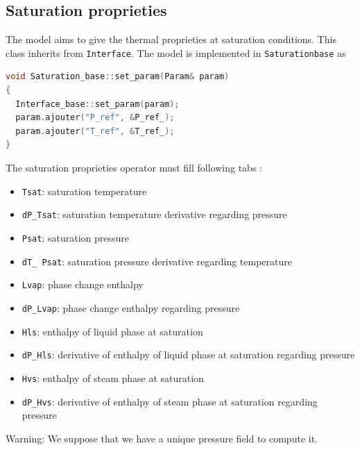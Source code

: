 \subsection{Saturation proprieties}
The model aims to give the thermal proprieties at saturation conditions. This class inherits from \texttt{Interface}.
The model is implemented in \texttt{Saturation\textunderscore base} as
\begin{lstlisting}[language=c++]
void Saturation_base::set_param(Param& param)
{
  Interface_base::set_param(param);
  param.ajouter("P_ref", &P_ref_);
  param.ajouter("T_ref", &T_ref_);
}
\end{lstlisting}
The saturation proprieties operator must fill following tabs :
\begin{itemize}
   \item[\small \textcolor{blue}{\ding{109}}] \texttt{Tsat}: saturation temperature
   \item[\small \textcolor{blue}{\ding{109}}] \texttt{dP\_Tsat}: saturation temperature derivative regarding pressure
   \item[\small \textcolor{blue}{\ding{109}}] \texttt{Psat}: saturation pressure
   \item[\small \textcolor{blue}{\ding{109}}] \texttt{dT\_ Psat}: saturation pressure derivative regarding temperature
   \item[\small \textcolor{blue}{\ding{109}}] \texttt{Lvap}: phase change enthalpy
   \item[\small \textcolor{blue}{\ding{109}}] \texttt{dP\_Lvap}: phase change enthalpy regarding pressure
   \item[\small \textcolor{blue}{\ding{109}}] \texttt{Hls}: enthalpy of liquid phase at saturation
   \item[\small \textcolor{blue}{\ding{109}}] \texttt{dP\_Hls}: derivative of enthalpy of liquid phase at saturation regarding pressure
   \item[\small \textcolor{blue}{\ding{109}}] \texttt{Hvs}: enthalpy of steam phase at saturation
   \item[\small \textcolor{blue}{\ding{109}}] \texttt{dP\_Hvs}: derivative of enthalpy of steam phase at saturation regarding pressure
\end{itemize}

{\color{red} Warning}:  We suppose that we have a unique pressure field to compute it.

